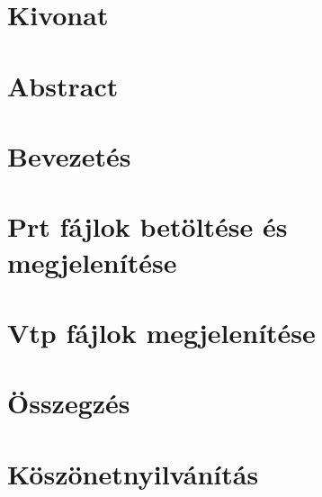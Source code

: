 \documentclass[11pt,a4paper,oneside]{report}
\begin{document}


\pagestyle{empty}
\tableofcontents



\chapter*{Kivonat}


\chapter*{Abstract}


\pagestyle{fancy}
\renewcommand{\chaptermark}[1]{\markboth{#1}{}}
\chapter{Bevezetés}


\chapter{Prt fájlok betöltése és megjelenítése}


\chapter{Vtp fájlok megjelenítése}


\chapter{Összegzés}


\chapter*{Köszönetnyilvánítás}


\renewcommand{\bibname}{Irodalomjegyzék}
\nocite{*}
\clearpage
{}
{}
\printbibliography

\pagestyle{empty}

\clearpage
{}
{}
\listoffigures
\end{document}
